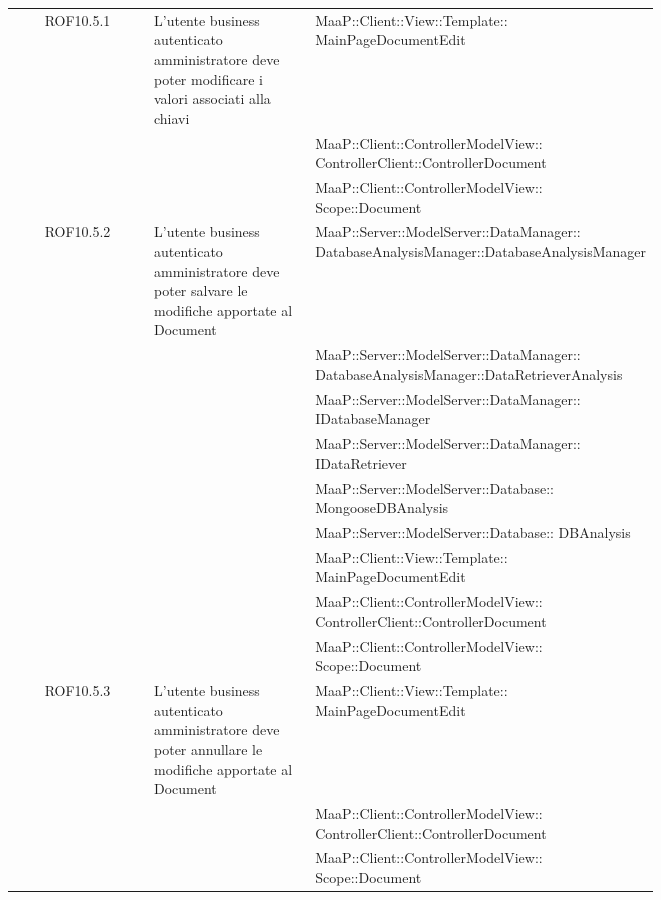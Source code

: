 \begin{center}
\begin{longtable}{|c|p{0.25\linewidth}|p{0.5\linewidth}|}
\midrule
ROF10.5.1
& L'utente business autenticato amministratore deve poter modificare i valori associati alla chiavi
& MaaP::Client::View::Template:: MainPageDocumentEdit\\
& & MaaP::Client::ControllerModelView:: ControllerClient::ControllerDocument\\
& & MaaP::Client::ControllerModelView:: Scope::Document\\

\midrule
ROF10.5.2
& L'utente business autenticato amministratore deve poter salvare le modifiche apportate al Document
& MaaP::Server::ModelServer::DataManager:: DatabaseAnalysisManager::DatabaseAnalysisManager\\
& & MaaP::Server::ModelServer::DataManager:: DatabaseAnalysisManager::DataRetrieverAnalysis\\
& & MaaP::Server::ModelServer::DataManager:: IDatabaseManager\\
& & MaaP::Server::ModelServer::DataManager:: IDataRetriever\\
& & MaaP::Server::ModelServer::Database:: MongooseDBAnalysis\\
& & MaaP::Server::ModelServer::Database:: DBAnalysis\\
& & MaaP::Client::View::Template:: MainPageDocumentEdit\\
& & MaaP::Client::ControllerModelView:: ControllerClient::ControllerDocument\\
& & MaaP::Client::ControllerModelView:: Scope::Document\\

\midrule
ROF10.5.3
& L'utente business autenticato amministratore deve poter annullare le modifiche apportate al Document
& MaaP::Client::View::Template:: MainPageDocumentEdit\\
& & MaaP::Client::ControllerModelView:: ControllerClient::ControllerDocument\\
& & MaaP::Client::ControllerModelView:: Scope::Document\\


\end{longtable}
\end{center}
